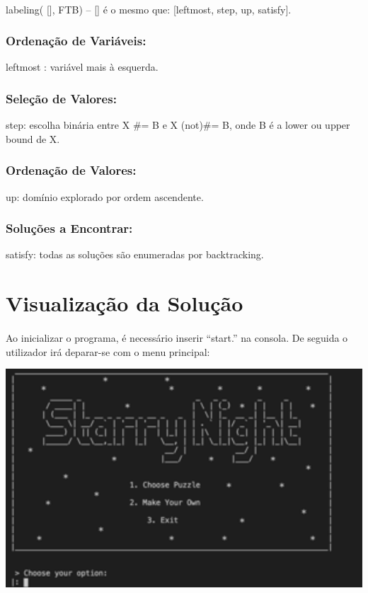 \documentclass[a4paper]{article}
\begin{document}
\paragraph{}
labeling( [], FTB) --
[] é o mesmo que: [leftmost, step, up, satisfy].

\subsubsection{Ordenação de Variáveis:}
leftmost : variável mais à esquerda.

\subsubsection{Seleção de Valores:}
step: escolha binária entre X \#= B e X (not)\#= B, onde B é a lower ou upper bound de X.

\subsubsection{Ordenação de Valores:}
up: domínio explorado por ordem ascendente.

\subsubsection{Soluções a Encontrar:}
satisfy: todas as soluções são enumeradas por backtracking.

\section{Visualização da Solução}

\paragraph{}
Ao inicializar o programa, é necessário inserir “start.” na consola. De seguida o utilizador irá deparar-se com o menu principal:

\begin{center}
    \includegraphics[scale=0.4]{img/2.png}
\end{center}
\end{document}
